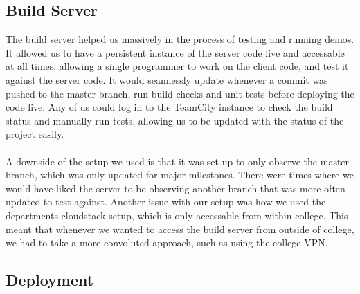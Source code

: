 \documentclass{article}
\begin{document}
\subsection{Build Server}
The build server helped us massively in the process of testing and running demos. It allowed us to have a persistent instance of the server code live and accessable at all times, allowing a single programmer to work on the client code, and test it against the server code. It would seamlessly update whenever a commit was pushed to the master branch, run build checks and unit tests before deploying the code live. Any of us could log in to the TeamCity instance to check the build status and manually run tests, allowing us to be updated with the status of the project easily.
\\\\
A downside of the setup we used is that it was set up to only observe the master branch, which was only updated for major milestones. There were times where we would have liked the server to be observing another branch that was more often updated to test against. Another issue with our setup was how we used the departments cloudstack setup, which is only accessable from within college. This meant that whenever we wanted to access the build server from outside of college, we had to take a more convoluted approach, such as using the college VPN.
\subsection{Deployment} %
\end{document}
